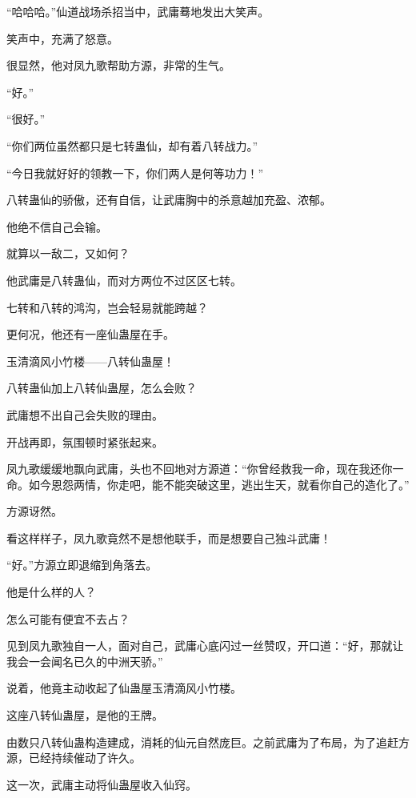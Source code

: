 
\begin{this_body}



“哈哈哈。”仙道战场杀招当中，武庸蓦地发出大笑声。

笑声中，充满了怒意。

很显然，他对凤九歌帮助方源，非常的生气。

“好。”

“很好。”

“你们两位虽然都只是七转蛊仙，却有着八转战力。”

“今日我就好好的领教一下，你们两人是何等功力！”

八转蛊仙的骄傲，还有自信，让武庸胸中的杀意越加充盈、浓郁。

他绝不信自己会输。

就算以一敌二，又如何？

他武庸是八转蛊仙，而对方两位不过区区七转。

七转和八转的鸿沟，岂会轻易就能跨越？

更何况，他还有一座仙蛊屋在手。

玉清滴风小竹楼——八转仙蛊屋！

八转蛊仙加上八转仙蛊屋，怎么会败？

武庸想不出自己会失败的理由。

开战再即，氛围顿时紧张起来。

凤九歌缓缓地飘向武庸，头也不回地对方源道：“你曾经救我一命，现在我还你一命。如今恩怨两情，你走吧，能不能突破这里，逃出生天，就看你自己的造化了。”

方源讶然。

看这样样子，凤九歌竟然不是想他联手，而是想要自己独斗武庸！

“好。”方源立即退缩到角落去。

他是什么样的人？

怎么可能有便宜不去占？

见到凤九歌独自一人，面对自己，武庸心底闪过一丝赞叹，开口道：“好，那就让我会一会闻名已久的中洲天骄。”

说着，他竟主动收起了仙蛊屋玉清滴风小竹楼。

这座八转仙蛊屋，是他的王牌。

由数只八转仙蛊构造建成，消耗的仙元自然庞巨。之前武庸为了布局，为了追赶方源，已经持续催动了许久。

这一次，武庸主动将仙蛊屋收入仙窍。


\end{this_body}
